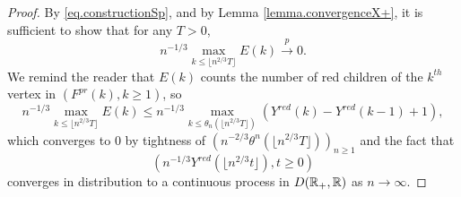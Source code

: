 \begin{proof}
By \eqref{eq.constructionSp}, and by Lemma \ref{lemma.convergenceX+}, it is sufficient to show that for any $T>0$,
$$n^{-1/3}\max_{k\leq \lfloor n^{2/3}T\rfloor}E(k)\overset{p}{\to}0.$$
We remind the reader that $E(k)$ counts the number of red children of the $k^{th}$ vertex in $(F^{pr}(k),k\geq 1)$, so
$$n^{-1/3}\max_{k\leq \lfloor n^{2/3}T\rfloor}E(k)\leq n^{-1/3}\max_{k\leq \theta_n(\lfloor n^{2/3}T\rfloor)}(Y^{red}(k)-Y^{red}(k-1)+1),$$
which converges to $0$ by tightness of $\left(n^{-2/3}\theta^{n}(\lfloor n^{2/3}T\rfloor)\right)_{n\geq 1}$ and the fact that $$\left(n^{-1/3}Y^{red}\left(\lfloor n^{2/3}t\rfloor\right),t\geq 0\right)$$ converges in distribution to a continuous process in $D({\mathbb R}_+,{\mathbb R})$ as $n\to\infty$.
\end{proof}

